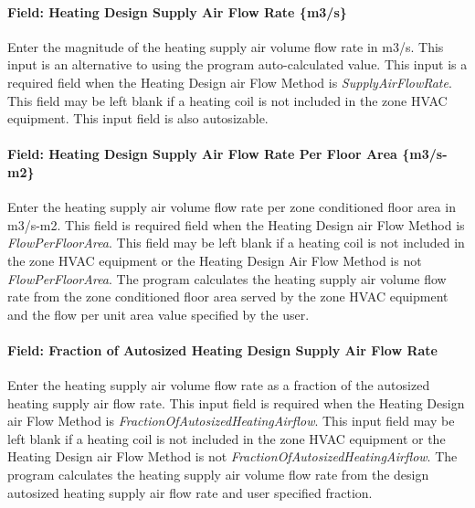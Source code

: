 \paragraph{Field: Heating Design Supply Air Flow Rate \{m3/s\}}\label{field-heating-design-supply-air-flow-rate-m3s}

Enter the magnitude of the heating supply air volume flow rate in m3/s. This input is an alternative to using the program auto-calculated value. This input is a required field when the Heating Design air Flow Method is \emph{SupplyAirFlowRate}. This field may be left blank if a heating coil is not included in the zone HVAC equipment. This input field is also autosizable.

\paragraph{Field: Heating Design Supply Air Flow Rate Per Floor Area \{m3/s-m2\}}\label{field-heating-design-supply-air-flow-rate-per-floor-area-m3s-m2}

Enter the heating supply air volume flow rate per zone conditioned floor area in m3/s-m2. This field is required field when the Heating Design air Flow Method is \emph{FlowPerFloorArea}. This field may be left blank if a heating coil is not included in the zone HVAC equipment or the Heating Design Air Flow Method is not \emph{FlowPerFloorArea}. The program calculates the heating supply air volume flow rate from the zone conditioned floor area served by the zone HVAC equipment and the flow per unit area value specified by the user.

\paragraph{Field: Fraction of Autosized Heating Design Supply Air Flow Rate}\label{field-fraction-of-autosized-heating-design-supply-air-flow-rate}

Enter the heating supply air volume flow rate as a fraction of the autosized heating supply air flow rate. This input field is required when the Heating Design air Flow Method is \emph{FractionOfAutosizedHeatingAirflow}. This input field may be left blank if a heating coil is not included in the zone HVAC equipment or the Heating Design air Flow Method is not \emph{FractionOfAutosizedHeatingAirflow}. The program calculates the heating supply air volume flow rate from the design autosized heating supply air flow rate and user specified fraction.

